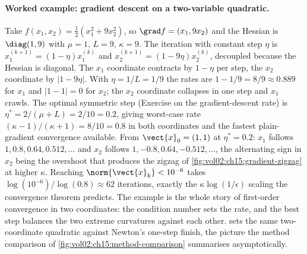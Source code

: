 \paragraph{Worked example: gradient descent on a two-variable
quadratic.}
Take $f(x_{1}, x_{2}) = \tfrac{1}{2}(x_{1}^{2} + 9 x_{2}^{2})$,
so $\grad f = (x_{1}, 9 x_{2})$ and the Hessian is $\diag(1, 9)$
with $\mu = 1$, $L = 9$, $\kappa = 9$. The iteration with constant
step $\eta$ is $x_{1}^{(k+1)} = (1 - \eta) x_{1}^{(k)}$ and
$x_{2}^{(k+1)} = (1 - 9 \eta) x_{2}^{(k)}$, decoupled because the
Hessian is diagonal. The $x_{1}$ coordinate contracts by $1 -
\eta$ per step, the $x_{2}$ coordinate by $|1 - 9 \eta|$. With
$\eta = 1/L = 1/9$ the rates are $1 - 1/9 = 8/9 \approx 0.889$ for
$x_{1}$ and $|1 - 1| = 0$ for $x_{2}$; the $x_{2}$ coordinate
collapses in one step and $x_{1}$ crawls. The optimal symmetric
step (Exercise on the gradient-descent rate) is $\eta^{*} = 2/(\mu
+ L) = 2/10 = 0.2$, giving worst-case rate $(\kappa - 1)/(\kappa +
1) = 8/10 = 0.8$ in both coordinates and the fastest plain-gradient
convergence available. From $\vect{x}_{0} = (1, 1)$ at $\eta^{*} =
0.2$: $x_{1}$ follows $1, 0.8, 0.64, 0.512, \ldots$ and $x_{2}$
follows $1, -0.8, 0.64, -0.512, \ldots$, the alternating sign in
$x_{2}$ being the overshoot that produces the zigzag of
\cref{fig:vol02:ch15:gradient-zigzag} at higher $\kappa$. Reaching
$\norm{\vect{x}_{k}} < 10^{-6}$ takes $\log(10^{-6})/\log(0.8)
\approx 62$ iterations, exactly the $\kappa \log(1/\epsilon)$
scaling the convergence theorem predicts. The example is the
whole story of first-order convergence in two coordinates: the
condition number sets the rate, and the best step balances the
two extreme curvatures against each other.
 sets the same two-coordinate
quadratic against Newton's one-step finish, the picture the method
comparison of \cref{fig:vol02:ch15:method-comparison} summarises
asymptotically.



